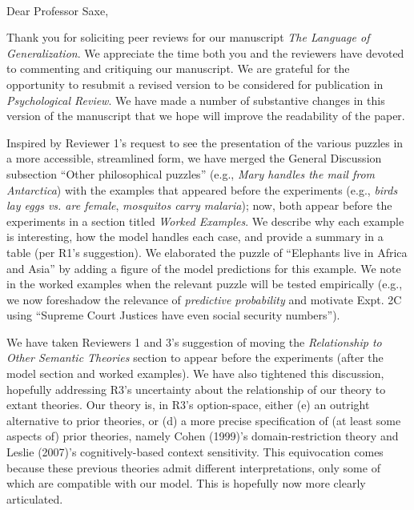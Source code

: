 \documentclass[11pt,letterpaper]{letter} %
\def\opening#1{\thispagestyle{empty}
{\centering\fromaddress \vspace{0.6in} \\ %
\hspace*{\longindentation}\hspace*{\fill}\par} %
\vspace{0.4in} %
\noindent #1 %
}
\begin{document}
\begin{letter}

\opening{Dear Professor Saxe,}

Thank you for soliciting peer reviews for our manuscript \emph{The Language of Generalization}. We appreciate the time both you and the reviewers have devoted to commenting and critiquing our manuscript. 
We are grateful for the opportunity to resubmit a revised version to be considered for publication in \emph{Psychological Review}.
We have made a number of substantive changes in this version of the manuscript that we hope will improve the readability of the paper.

Inspired by Reviewer 1's request to see the presentation of the various puzzles in a more accessible, streamlined form,
we have merged the General Discussion subsection ``Other philosophical puzzles'' (e.g., \emph{Mary handles the mail from Antarctica}) with the examples that appeared before the experiments (e.g., \emph{birds lay eggs vs. are female}, \emph{mosquitos carry malaria}); now, both appear before the experiments in a section titled \emph{Worked Examples}.
We describe why each example is interesting, how the model handles each case, and provide a summary in a table (per R1's suggestion).
We elaborated the puzzle of ``Elephants live in Africa and Asia'' by adding a figure of the model predictions for this example.
We note in the worked examples when the relevant puzzle will be tested empirically (e.g., we now foreshadow the relevance of \emph{predictive probability} and motivate Expt. 2C using ``Supreme Court Justices have even social security numbers'').

We have taken Reviewers 1 and 3's suggestion of moving the \emph{Relationship to Other Semantic Theories} section to appear before the experiments (after the model section and worked examples).
We have also tightened this discussion, hopefully addressing R3's uncertainty about the relationship of our theory to extant theories. 
Our theory is, in R3's option-space, either (e) an outright alternative to prior theories, or (d) a more precise specification of (at least some aspects of) prior theories, namely Cohen (1999)'s domain-restriction theory and Leslie (2007)'s cognitively-based context sensitivity.
This equivocation comes because these previous theories admit different interpretations, only some of which are compatible with our model.
This is hopefully now more clearly articulated.


\end{letter}
\end{document}
